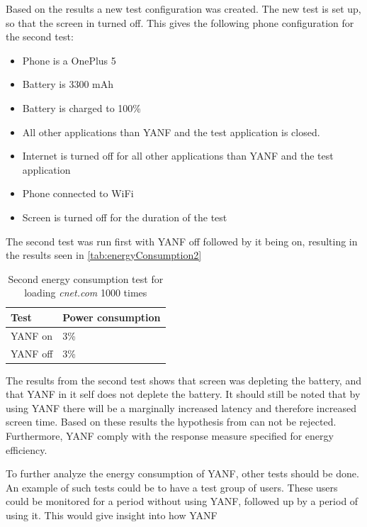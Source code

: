\documentclass[main.tex]{subfiles}
\begin{document}
Based on the results a new test configuration was created. The new test is set up, so that the screen in turned off. This gives the following phone configuration for the second test:

\begin{itemize}
    \item Phone is a OnePlus 5
    \item Battery is 3300 mAh
    \item Battery is charged to 100\%
    \item All other applications than YANF and the test application is closed. 
    \item Internet is turned off for all other applications than YANF and the test application
    \item Phone connected to WiFi
    \item Screen is turned off for the duration of the test
\end{itemize}

The second test was run first with YANF off followed by it being on, resulting in the results seen in \autoref{tab:energyConsumption2}


\begin{table}[H]
    \centering
    \begin{tabular}{|l|l|}\hline
        \textbf{Test}   & \textbf{Power consumption}    \\ \hline
        YANF on         & 3\%                          \\ \hline
        YANF off        & 3\%                          \\ \hline
    \end{tabular}
    \caption{Second energy consumption test for loading \textit{cnet.com} 1000 times}
    \label{tab:energyConsumption2}
\end{table}

The results from the second test shows that screen was depleting the battery, and that YANF in it self does not deplete the battery. It should still be noted that by using YANF there will be a marginally increased latency and therefore increased screen time. Based on these results the hypothesis from  can not be rejected. Furthermore, YANF comply with the response measure specified for energy efficiency.

To further analyze the energy consumption of YANF, other tests should be done. An example of such tests could be to have a test group of users. These users could be monitored for a period without using YANF, followed up by a period of using it. This would give insight into how YANF  



\end{document}
